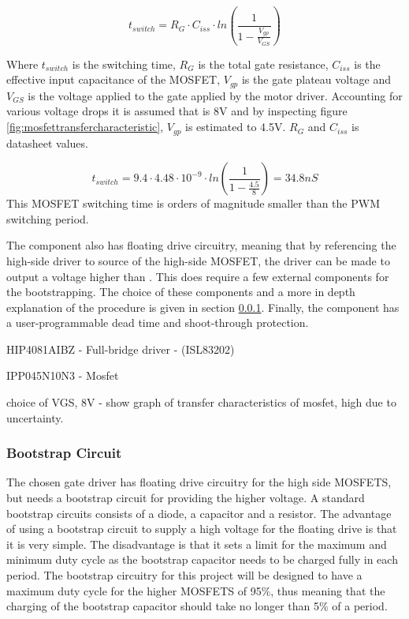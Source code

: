 \begin{equation}
t_{switch} = R_G \cdot C_{iss} \cdot ln\left(\frac{1}{1-\frac{V_{gp}}{V_{GS}}}\right) 
\label{eq:mosfet_turn_on}
\end{equation}

Where $t_{switch}$ is the switching time, $R_G$ is the total gate resistance, $C_{iss}$ is the effective input capacitance of the
MOSFET, $V_{gp}$ is the gate plateau voltage and $V_{GS}$ is the voltage applied to the gate applied by the motor driver.
Accounting for various voltage drops it is assumed that \vgs is 8V and by inspecting figure \ref{fig:mosfettransfercharacteristic}, $V_{gp}$ is estimated to 4.5V.
$R_G$ and $C_{iss}$ is datasheet values.

\begin{equation}
t_{switch} = 9.4 \cdot 4.48 \cdot 10^{-9} \cdot ln\left(\frac{1}{1-\frac{4.5}{8}}\right) = 34.8 nS 
\label{eq:mosfet_turn_on}
\end{equation}
This MOSFET switching time is orders of magnitude smaller than the PWM switching period.

The component also has floating drive circuitry, meaning that by referencing the high-side driver to source of the high-side MOSFET, the driver can be made to output a voltage higher than \vcc.
This does require a few external components for the bootstrapping.
The choice of these components and a more in depth explanation of the procedure is given in section \ref{ssub:bootstrap_circuit}.
Finally, the component has a user-programmable dead time and shoot-through protection. 

HIP4081AIBZ - Full-bridge driver - (ISL83202)

IPP045N10N3 - Mosfet

choice of VGS, 8V - show graph of transfer characteristics of mosfet, high due to uncertainty.

\subsubsection{Bootstrap Circuit}
\label{ssub:bootstrap_circuit}
The chosen gate driver has floating drive circuitry for the high side MOSFETS, but needs a bootstrap circuit for providing the higher voltage. 
A standard bootstrap circuits consists of a diode, a capacitor and a resistor. 
The advantage of using a bootstrap circuit to supply a high voltage for the floating drive is that it is very simple. 
The disadvantage is that it sets a limit for the maximum and minimum duty cycle as the bootstrap capacitor needs to be charged fully in each period.
The bootstrap circuitry for this project will be designed to have a maximum duty cycle for the higher MOSFETS of 95\%, thus meaning that the charging of the bootstrap capacitor should take no longer than 5\% of a period.  

